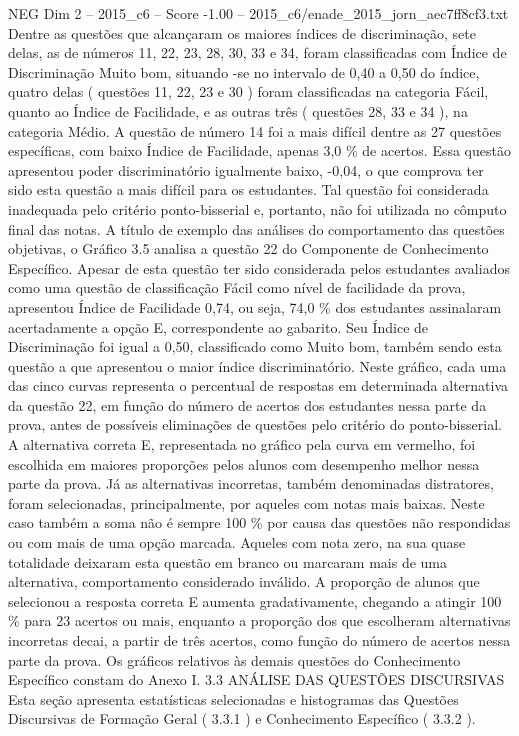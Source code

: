 \begin{textsample}{NEG Dim 2 – 2015\_c6 – Score -1.00 – 2015\_c6/enade\_2015\_jorn\_aec7ff8cf3.txt}
Dentre as questões que alcançaram os maiores índices de discriminação, sete delas, as de números 11, 22, 23, 28, 30, 33 e 34, foram classificadas com Índice de Discriminação Muito bom, situando -se no intervalo de 0,40 a 0,50 do índice, quatro delas ( questões 11, 22, 23 e 30 ) foram classificadas na categoria Fácil, quanto ao Índice de Facilidade, e as outras três ( questões 28, 33 e 34 ), na categoria Médio.
A questão de número 14 foi a mais difícil dentre as 27 questões específicas, com baixo Índice de Facilidade, apenas 3,0 \% de acertos.
Essa questão apresentou poder discriminatório igualmente baixo, -0,04, o que comprova ter sido esta questão a mais difícil para os estudantes.
Tal questão foi considerada inadequada pelo critério ponto-bisserial e, portanto, não foi utilizada no cômputo final das notas.
A título de exemplo das análises do comportamento das questões objetivas, o Gráfico 3.5 analisa a questão 22 do Componente de Conhecimento Específico.
Apesar de esta questão ter sido considerada pelos estudantes avaliados como uma questão de classificação Fácil como nível de facilidade da prova, apresentou Índice de Facilidade 0,74, ou seja, 74,0 \% dos estudantes assinalaram acertadamente a opção E, correspondente ao gabarito.
Seu Índice de Discriminação foi igual a 0,50, classificado como Muito bom, também sendo esta questão a que apresentou o maior índice discriminatório.
Neste gráfico, cada uma das cinco curvas representa o percentual de respostas em determinada alternativa da questão 22, em função do número de acertos dos estudantes nessa parte da prova, antes de possíveis eliminações de questões pelo critério do ponto-bisserial.
A alternativa correta E, representada no gráfico pela curva em vermelho, foi escolhida em maiores proporções pelos alunos com desempenho melhor nessa parte da prova.
Já as alternativas incorretas, também denominadas distratores, foram selecionadas, principalmente, por aqueles com notas mais baixas.
Neste caso também a soma não é sempre 100 \% por causa das questões não respondidas ou com mais de uma opção marcada.
Aqueles com nota zero, na sua quase totalidade deixaram esta questão em branco ou marcaram mais de uma alternativa, comportamento considerado inválido.
A proporção de alunos que selecionou a resposta correta E aumenta gradativamente, chegando a atingir 100 \% para 23 acertos ou mais, enquanto a proporção dos que escolheram alternativas incorretas decai, a partir de três acertos, como função do número de acertos nessa parte da prova.
Os gráficos relativos às demais questões do Conhecimento Específico constam do Anexo I. 3.3 ANÁLISE DAS QUESTÕES DISCURSIVAS Esta seção apresenta estatísticas selecionadas e histogramas das Questões Discursivas de Formação Geral ( 3.3.1 ) e Conhecimento Específico ( 3.3.2 ).

\end{textsample}
